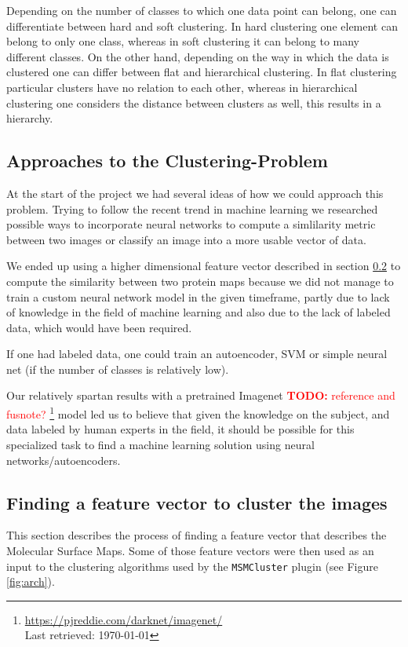 \documentclass[journal]{vgtc}       %
\newcommand{\todo}[1]{\textcolor{red}{\textbf{TODO:} #1}}
\begin{document}
Depending on the number of classes to which one data point can belong, one can differentiate  between hard and soft clustering. In hard clustering one element can belong to only one class, whereas in soft clustering it can belong to many different classes.
On the other hand, depending on the way in which the data is clustered one can differ between flat and hierarchical clustering. In flat clustering particular clusters have no relation to each other, whereas in hierarchical clustering one considers the distance between clusters as well, this results in a hierarchy.


\subsection{Approaches to the Clustering-Problem}

At the start of the project we had several ideas of how we could approach this problem. 
Trying to follow the recent trend in machine learning we researched possible ways to incorporate neural networks to compute a simlilarity metric between  two images or classify an image into a more usable vector of data.

We ended up using a higher dimensional feature vector described in section \ref{sec:featurev} to  compute the similarity between two protein maps because we did not manage to train a custom neural network model in the given timeframe, partly due to lack of knowledge in the field of machine learning and also due to the lack of labeled data, which would have been required.

If one had labeled data, one could train an autoencoder, SVM or simple neural net (if the number of classes is relatively low).

Our relatively spartan results with a pretrained Imagenet \todo{reference and fusnote?} \cite{imagenet}\footnote{\url{https://pjreddie.com/darknet/imagenet/} \\ Last retrieved: \today}  model led us to believe that given the knowledge on the subject, and  data labeled by human experts in the field, it should be possible for this specialized task to find a machine learning  solution using neural networks/autoencoders.

\subsection{Finding a feature vector to cluster the images}\label{sec:featurev}

This section describes the process of finding a feature vector that describes the  Molecular Surface Maps. Some of those feature vectors were then used as an input to the clustering algorithms used by the  \verb|MSMCluster| plugin (see  Figure \ref{fig:arch}).
\end{document}
